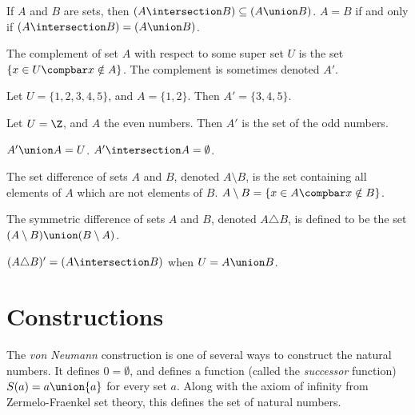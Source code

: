 \documentclass[12pt]{article}
\begin{document}
\begin{rmk}
    If $A$ and $B$ are sets, then $(A \intersection B) \subseteq (A \union B)$. $A = B$ if and only if $(A \intersection B) = (A \union B)$.
\end{rmk}

\begin{defn}
    The complement of set $A$ with respect to some super set $U$ is the set $\left\{x \in U \compbar x \notin A\right\}$. The complement is sometimes denoted $A'$.
\end{defn}

\begin{exmp}
    Let $U = \{1, 2, 3, 4, 5\}$, and $A = \{1, 2\}$. Then $A' = \{3, 4, 5\}$.
\end{exmp}

\begin{exmp}
    Let $U = \Z$, and $A$ the even numbers. Then $A'$ is the set of the odd numbers. 
\end{exmp}

\begin{rmk}
    $A' \union A = U$. $A' \intersection A = \emptyset$.
\end{rmk}

\begin{defn}\label{set-difference}
    The set difference of sets $A$ and  $B$, denoted $A \setminus B$, is the set containing all elements of $A$ which are not elements of $B$. $A \setminus B = \left\{x \in A \compbar x \notin B\right\}$.
\end{defn}

\begin{defn}\label{symmetric-difference}
    The symmetric difference of sets $A$ and $B$, denoted $A \triangle B$, is defined to be the set $(A \setminus B) \union (B \setminus A)$.
\end{defn}

\begin{rmk}
    $(A \triangle B)' = (A \intersection B)$ when $U = A \union B$.
\end{rmk}

\section{Constructions}

The \emph{von Neumann} construction is one of several ways to construct the natural numbers. It defines $0 = \emptyset$, and defines a function (called the \emph{successor} function) $S(a) = a \union \{a\}$ for every set $a$. Along with the axiom of infinity from Zermelo-Fraenkel set theory, this defines the set of natural numbers.
\end{document}
